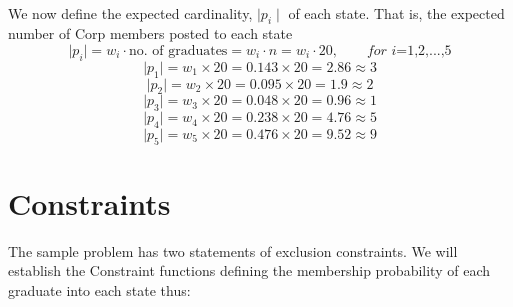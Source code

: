 \documentclass[a4paper]{book}
\begin{document}
			\paragraph{}
				We now define the expected cardinality, $\mid p_i\mid$ of each state. That is, the expected number of Corp members posted to each state
				\begin{equation}
					\mid p_i \mid = w_i \cdot \text{no. of graduates} = w_i \cdot n = w_i \cdot 20, \qquad \textit{for i=1,2,...,5}
				\end{equation}
				\begin{equation}
					\mid p_1 \mid = w_1 \times 20 = 0.143 \times 20 = 2.86 \approx 3
				\end{equation}
				\begin{equation}
					\mid p_2 \mid = w_2 \times 20 = 0.095 \times 20 = 1.9 \approx 2
				\end{equation}
				\begin{equation}
					\mid p_3 \mid = w_3 \times 20 = 0.048 \times 20 = 0.96 \approx 1
				\end{equation}
				\begin{equation}
					\mid p_4 \mid = w_4 \times 20 = 0.238 \times 20 = 4.76 \approx 5
				\end{equation}
				\begin{equation}
					\mid p_5 \mid = w_5 \times 20 = 0.476 \times 20 = 9.52 \approx 9
				\end{equation}
		\section{Constraints}
			The sample problem has two statements of exclusion constraints. We will establish the Constraint functions defining the membership probability of each graduate into each state thus:
\end{document}
